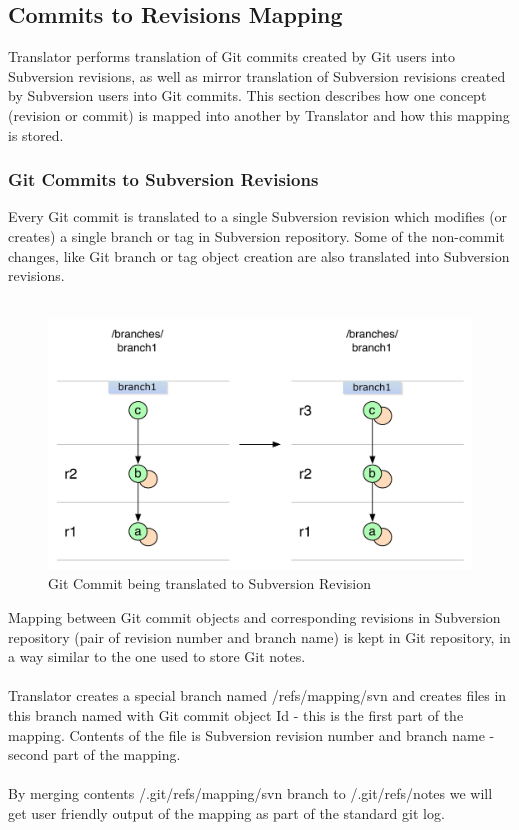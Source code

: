 \subsection{Commits to Revisions Mapping}

Translator performs translation of Git commits created by Git users into Subversion revisions, as well
as mirror translation of Subversion revisions created by Subversion users into Git commits. This section
describes how one concept (revision or commit) is mapped into another by Translator and how this mapping 
is stored.

\subsubsection{Git Commits to Subversion Revisions}

Every Git commit is translated to a single Subversion revision which modifies (or creates) a single branch or tag
in Subversion repository. Some of the non-commit changes, like Git branch or tag object creation are also translated into Subversion revisions.\\\\
\begin{figure}[!h]
\centering
\includegraphics[width=\linewidth]{img/diagrams/single_change_git_to_svn.pdf}
\caption{Git Commit being translated to Subversion Revision}
\label{simple_git_to_svn}
\end{figure}Mapping between Git commit objects and corresponding revisions in Subversion repository (pair of revision number and branch name) is 
kept in Git repository, in a way similar to the one used to store Git notes. 
\\\\
Translator creates a special branch named /refs/mapping/svn and creates files in this branch named with Git commit object Id - this is the first part of the mapping. %
Contents of the file is Subversion revision number and branch name - second part of the mapping.
\\\\ 
By merging contents /.git/refs/mapping/svn branch to /.git/refs/notes we will get user friendly output of the mapping as part of the standard git log.

